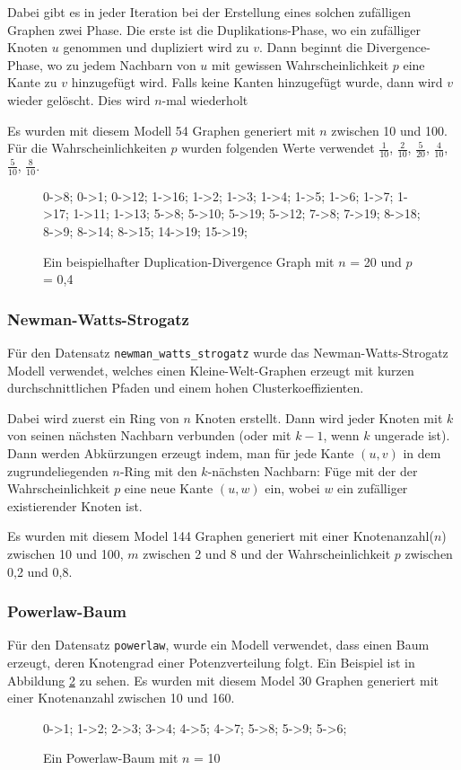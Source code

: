 \documentclass[12pt,a4paper,onecolumn,oneside,titlepage]{article}
\newcommand{\vars}{\texttt}
\begin{document}
Dabei gibt es in jeder Iteration bei der Erstellung eines solchen zufälligen Graphen zwei Phase. Die erste ist die Duplikations-Phase, wo ein zufälliger Knoten $u$ genommen und dupliziert wird zu $v$. Dann beginnt die Divergence-Phase, wo zu jedem Nachbarn von $u$ mit gewissen Wahrscheinlichkeit $p$ eine Kante zu $v$ hinzugefügt wird. Falls keine Kanten hinzugefügt wurde, dann wird $v$ wieder gelöscht. Dies wird $n$-mal wiederholt 

Es wurden mit diesem Modell 54 Graphen generiert mit $n$ zwischen 10 und 100. Für die Wahrscheinlichkeiten $p$ wurden folgenden Werte verwendet $\frac{1}{10}$, $\frac{2}{10}$, $\frac{5}{20}$, $\frac{4}{10}$, $\frac{5}{10}$, $\frac{8}{10}$.
\begin{figure}
{
0->8;
0->1;
0->12;
1->16;
1->2;
1->3;
1->4;
1->5;
1->6;
1->7;
1->17;
1->11;
1->13;
5->8;
5->10;
5->19;
5->12;
7->8;
7->19;
8->18;
8->9;
8->14;
8->15;
14->19;
15->19;
}
\caption{Ein beispielhafter Duplication-Divergence Graph mit $n$ = 20 und $p$ = 0,4}
\label{fig:duplication-divergence}
\end{figure}

\subsubsection{Newman-Watts-Strogatz}
Für den Datensatz \vars{newman\_watts\_strogatz} wurde das Newman-Watts-Strogatz Modell verwendet\cite{Newman99}, welches einen Kleine-Welt-Graphen erzeugt mit kurzen durchschnittlichen Pfaden und einem hohen Clusterkoeffizienten.

Dabei wird zuerst ein Ring von $n$ Knoten erstellt. Dann wird jeder Knoten mit $k$ von seinen nächsten Nachbarn verbunden (oder mit $k-1$, wenn $k$ ungerade ist).
Dann werden Abkürzungen erzeugt indem, man für jede Kante $(u,v)$ in dem zugrundeliegenden $n$-Ring mit den $k$-nächsten Nachbarn: Füge mit der der Wahrscheinlichkeit $p$ eine neue Kante $(u,w)$ ein, wobei $w$ ein zufälliger existierender Knoten ist.

Es wurden mit diesem Model 144 Graphen generiert mit einer Knotenanzahl($n$) zwischen 10 und 100, $m$ zwischen 2 und 8 und der Wahrscheinlichkeit $p$ zwischen 0,2 und 0,8.

\subsubsection{Powerlaw-Baum}
Für den Datensatz \vars{powerlaw}, wurde ein Modell verwendet, dass einen Baum erzeugt, deren Knotengrad einer Potenzverteilung folgt. Ein Beispiel ist in Abbildung \ref{fig:powerlaw-tree} zu sehen.
Es wurden mit diesem Model 30 Graphen generiert mit einer Knotenanzahl zwischen 10 und 160.
\begin{figure}
{
 0->1;
1->2;
2->3;
3->4;
4->5;
4->7;
5->8;
5->9;
5->6;
}
\caption{Ein Powerlaw-Baum mit $n$ = 10}
\label{fig:powerlaw-tree}
\end{figure}
\end{document}
